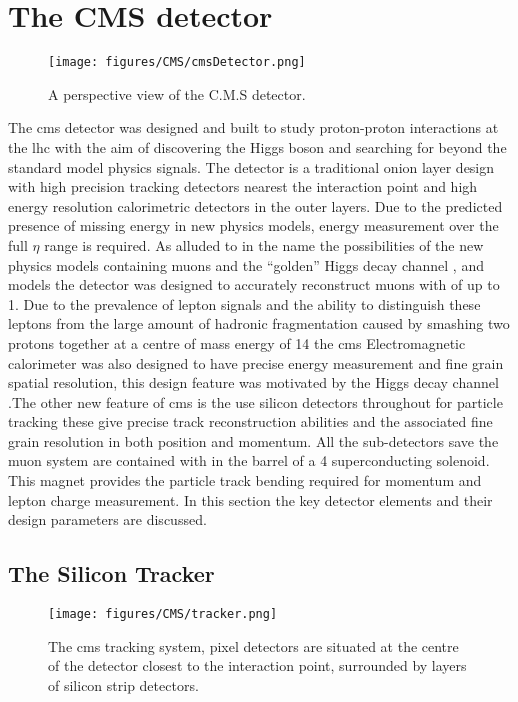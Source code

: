 \chapter{The CMS detector} %
\label{cha:the_cms_detector}
\begin{figure}[htbp]
  \centering
    \texttt{[image: figures/CMS/cmsDetector.png]}
  \caption{A perspective view of the C.M.S detector\cite{cms-sketchup}.}
  \label{fig:figures_CMS_cmsDetector}
\end{figure}

The \ac{cms} detector was designed and built to study proton-proton 
interactions at the \ac{lhc} with the aim of discovering the Higgs boson and 
searching for beyond the standard model physics signals. The detector is a 
traditional onion layer design with high precision tracking detectors nearest 
the interaction point and high energy resolution calorimetric detectors in the 
outer layers. Due to the predicted presence of missing energy \MET in new 
physics models, energy measurement over the full $\eta$ range is required. As 
alluded to in the name the possibilities of the new physics models containing 
muons and the ``golden'' Higgs decay channel 
\HepProcess{\PH\to\PZ\PZ\to\Pmu\Pmu\Pmu\Pmu}, and \PZprime models the detector 
was designed to accurately reconstruct muons with \PT of up to \unit{1}{\TeV}. 
Due to the prevalence of lepton signals and the ability to distinguish these 
leptons from the large amount of hadronic fragmentation caused by smashing two 
protons together at a centre of mass energy of \unit{14}{\TeV} the \ac{cms} 
Electromagnetic calorimeter was also designed to have precise energy 
measurement and fine grain spatial resolution, this design feature was motivated by the Higgs decay channel \HepProcess{\PH\to\Pphoton\Pphoton}.The 
other new feature of \ac{cms} is the use silicon detectors throughout for 
particle tracking these give precise track reconstruction abilities and the 
associated fine grain resolution in both position and momentum. All the 
sub-detectors save the muon system are contained with in the barrel of a 
\unit{4}{\tesla} superconducting solenoid. This magnet provides the particle 
track bending required for momentum and lepton charge measurement. In this 
section the key detector elements and their design parameters are discussed.

\section{The Silicon Tracker} %
\label{sec:the_silicon_tracker}
\begin{figure}[htbp]
  \centering
    \texttt{[image: figures/CMS/tracker.png]}
  \caption{The \ac{cms} tracking system, pixel detectors are situated at the 
  centre of the detector closest to the interaction point, surrounded by layers 
  of silicon strip detectors\cite{cms-sketchup}.}
  \label{fig:figures_CMS_tracker}
\end{figure}

